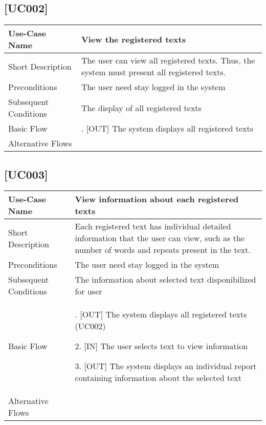 \documentclass[11pt, twoside, a4paper]{book}
\begin{document}
			\subsection{[UC002]}			
				\begin{tabular}{|>{\centering\arraybackslash}m{3cm} |>{\arraybackslash}m{9cm}|}										   \hline
					Use-Case Name 			& [UC002] View the registered texts																	\\ \hline
					Short Description  		& The user can view all registered texts. Thus, the system must present all registered texts.    	\\ \hline	
					Preconditions  			& The user need stay logged in the system      														\\ \hline
					Subsequent Conditions	& The display of all registered texts																\\ \hline
					Basic Flow  			& 	1. [OUT] The system displays all registered texts														\\ \hline
				Alternative Flows  		&       																								\\ \hline
			\end{tabular}

			\subsection{[UC003]}			
				\begin{tabular}{|>{\centering\arraybackslash}m{3cm} |>{\arraybackslash}m{9cm}|}										   			   									   \hline
					Use-Case Name 			& [UC003] View information about each registered texts																								\\ \hline
					Short Description  		& Each registered text has individual detailed information that the user can view, such as the number of words and repeats present in the text.    	\\ \hline	
					Preconditions  			& The user need stay logged in the system      																										\\ \hline
					Subsequent Conditions	& The information about selected text disponibilized for user																						\\ \hline
					Basic Flow  			& 	1. [OUT] The system displays all registered texts	(UC002)													
											  
												2. [IN] The user selects text to view information														
											  
												3. [OUT] The system displays an individual report containing information about the selected text														\\ \hline
				Alternative Flows  		&       																																				\\ \hline
			\end{tabular}
			
\end{document}
